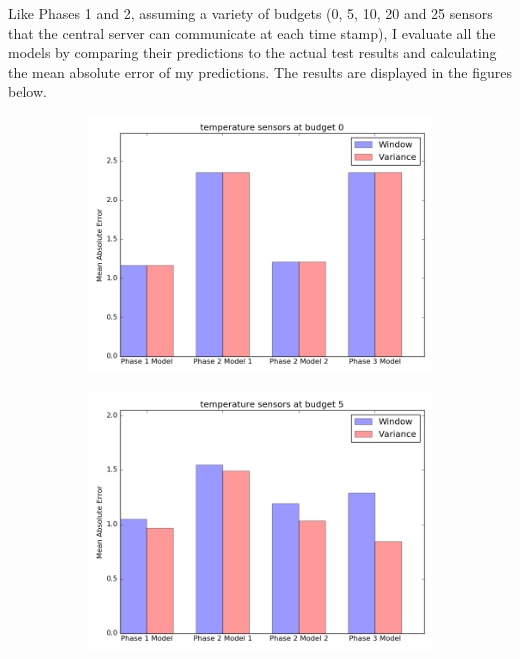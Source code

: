 \documentclass{article}
\begin{document}
Like Phases 1 and 2,
assuming a variety of budgets (0, 5, 10, 20 and 25
sensors that the central server can communicate at
each time stamp), I evaluate all the models by comparing
their predictions to the actual test results and
calculating the mean absolute error of my
predictions. The results are displayed in the figures
below.

\newpage

\begin{figure}[h!]
	\begin{subfigure}{\linewidth}
	\includegraphics[scale=0.5]{temperature_0_final.png}
	\end{subfigure}
	\begin{subfigure}{\linewidth}
	\includegraphics[scale=0.5]{temperature_5_final.png}
	\end{subfigure}
\end{figure}
\end{document}
